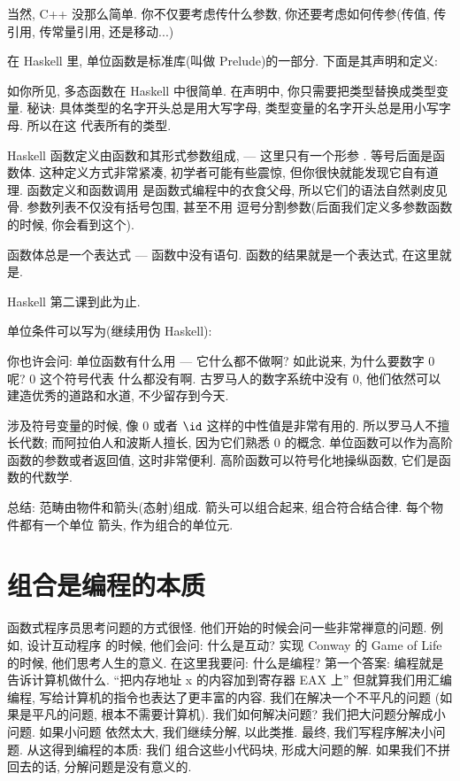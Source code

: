 当然, C++ 没那么简单. 你不仅要考虑传什么参数, 你还要考虑如何传参(传值, 传引用, 传常量引用, 还是移动...)

在 Haskell 里, 单位函数是标准库(叫做 Prelude)的一部分. 下面是其声明和定义:


如你所见, 多态函数在 Haskell 中很简单. 在声明中, 你只需要把类型替换成类型变量. 秘诀:
具体类型的名字开头总是用大写字母, 类型变量的名字开头总是用小写字母. 所以在这 
代表所有的类型.

Haskell 函数定义由函数和其形式参数组成, --- 这里只有一个形参 . 等号后面是函数体.
这种定义方式非常紧凑, 初学者可能有些震惊, 但你很快就能发现它自有道理. 函数定义和函数调用
是函数式编程中的衣食父母, 所以它们的语法自然剥皮见骨. 参数列表不仅没有括号包围, 甚至不用
逗号分割参数(后面我们定义多参数函数的时候, 你会看到这个).

函数体总是一个表达式 --- 函数中没有语句. 函数的结果就是一个表达式, 在这里就是.

Haskell 第二课到此为止.

单位条件可以写为(继续用伪 Haskell):

你也许会问: 单位函数有什么用 --- 它什么都不做啊? 如此说来, 为什么要数字 0 呢? 0 这个符号代表
什么都没有啊. 古罗马人的数字系统中没有 0, 他们依然可以建造优秀的道路和水道, 不少留存到今天.

涉及符号变量的时候, 像 0 或者 $\id$ 这样的中性值是非常有用的. 所以罗马人不擅长代数;
而阿拉伯人和波斯人擅长, 因为它们熟悉 0 的概念. 单位函数可以作为高阶函数的参数或者返回值,
这时非常便利. 高阶函数可以符号化地操纵函数, 它们是函数的代数学.

总结: 范畴由物件和箭头(态射)组成. 箭头可以组合起来, 组合符合结合律. 每个物件都有一个单位
箭头, 作为组合的单位元.

\section{组合是编程的本质}

函数式程序员思考问题的方式很怪. 他们开始的时候会问一些非常禅意的问题. 例如, 设计互动程序
的时候, 他们会问: 什么是互动? 实现 Conway 的 Game of Life 的时候, 他们思考人生的意义.
在这里我要问: 什么是编程? 第一个答案: 编程就是告诉计算机做什么. ``把内存地址 x 的内容加到寄存器 EAX 上''
但就算我们用汇编编程, 写给计算机的指令也表达了更丰富的内容. 我们在解决一个不平凡的问题
(如果是平凡的问题, 根本不需要计算机). 我们如何解决问题? 我们把大问题分解成小问题. 如果小问题
依然太大, 我们继续分解, 以此类推. 最终, 我们写程序解决小问题. 从这得到编程的本质: 我们
组合这些小代码块, 形成大问题的解. 如果我们不拼回去的话, 分解问题是没有意义的.

